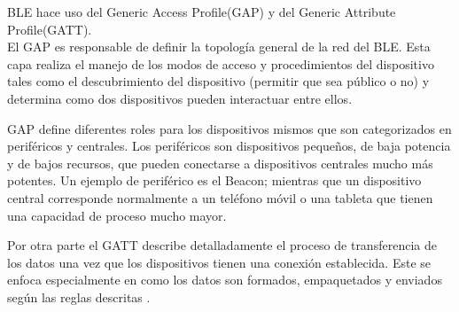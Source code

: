 BLE hace uso del Generic Access Profile(GAP) y del Generic Attribute Profile(GATT). 
\\
El GAP es responsable de definir la topología general de la red del BLE. Esta capa realiza el manejo de los modos de acceso y procedimientos del dispositivo tales como el descubrimiento del dispositivo (permitir que sea público o no) y determina como dos dispositivos pueden interactuar entre ellos.
\\ \par
GAP define diferentes roles para los dispositivos mismos que son categorizados en periféricos y centrales.
Los periféricos son dispositivos pequeños, de baja potencia y de bajos recursos, que pueden conectarse a dispositivos centrales mucho más potentes. Un ejemplo de periférico es el Beacon; mientras que un dispositivo central corresponde normalmente a un teléfono móvil o una tableta que tienen una capacidad de proceso mucho mayor.
\\ \par
Por otra parte el GATT describe detalladamente el proceso de transferencia de los datos una vez que los dispositivos tienen una conexión establecida. Este se enfoca especialmente en como los datos son formados, empaquetados y enviados según las reglas descritas \cite{Bluetooth2}.
